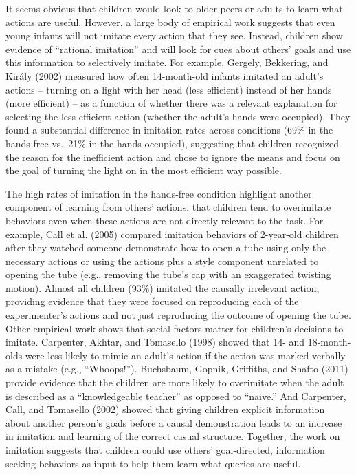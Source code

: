 \documentclass[english,floatsintext,man]{apa6}
\theoremstyle{definition}
\theoremstyle{definition}
\theoremstyle{definition}
\theoremstyle{remark}
\begin{document}
It seems obvious that children would look to older peers or adults to
learn what actions are useful. However, a large body of empirical work
suggests that even young infants will not imitate every action that they
see. Instead, children show evidence of \enquote{rational imitation} and
will look for cues about others' goals and use this information to
selectively imitate. For example, Gergely, Bekkering, and Király (2002)
measured how often 14-month-old infants imitated an adult's actions --
turning on a light with her head (less efficient) instead of her hands
(more efficient) -- as a function of whether there was a relevant
explanation for selecting the less efficient action (whether the adult's
hands were occupied). They found a substantial difference in imitation
rates across conditions (69\% in the hands-free vs.~21\% in the
hands-occupied), suggesting that children recognized the reason for the
inefficient action and chose to ignore the means and focus on the goal
of turning the light on in the most efficient way possible.

The high rates of imitation in the hands-free condition highlight
another component of learning from others' actions: that children tend
to overimitate behaviors even when these actions are not directly
relevant to the task. For example, Call et al. (2005) compared imitation
behaviors of 2-year-old children after they watched someone demonstrate
how to open a tube using only the necessary actions or using the actions
plus a style component unrelated to opening the tube (e.g., removing the
tube's cap with an exaggerated twisting motion). Almost all children
(93\%) imitated the causally irrelevant action, providing evidence that
they were focused on reproducing each of the experimenter's actions and
not just reproducing the outcome of opening the tube. Other empirical
work shows that social factors matter for children's decisions to
imitate. Carpenter, Akhtar, and Tomasello (1998) showed that 14- and
18-month-olds were less likely to mimic an adult's action if the action
was marked verbally as a mistake (e.g., \enquote{Whoops!}). Buchsbaum,
Gopnik, Griffiths, and Shafto (2011) provide evidence that the children
are more likely to overimitate when the adult is described as a
\enquote{knowledgeable teacher} as opposed to \enquote{naive.} And
Carpenter, Call, and Tomasello (2002) showed that giving children
explicit information about another person's goals before a causal
demonstration leads to an increase in imitation and learning of the
correct casual structure. Together, the work on imitation suggests that
children could use others' goal-directed, information seeking behaviors
as input to help them learn what queries are useful.
\end{document}

